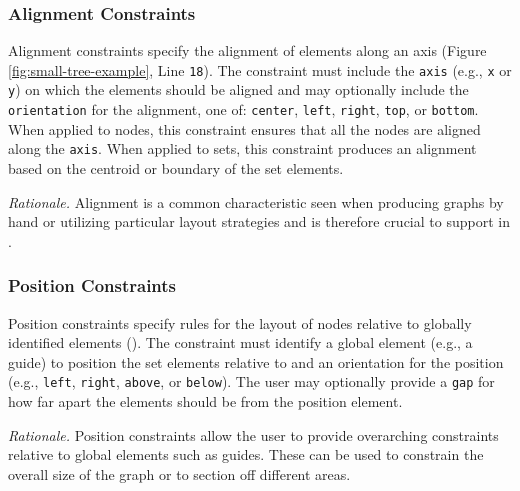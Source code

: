 \subsubsection{Alignment Constraints}
 Alignment constraints
specify the alignment of elements along an axis (Figure
\ref{fig:small-tree-example}, Line \texttt{18}). The constraint must
include the \texttt{axis} (e.g., \texttt{x} or \texttt{y}) on which the
elements should be aligned and may optionally include the
\texttt{orientation} for the alignment, one of: \texttt{center},
\texttt{left}, \texttt{right}, \texttt{top}, or \texttt{bottom}. When
applied to nodes, this constraint ensures that all the nodes are aligned
along the \texttt{axis}. When applied to sets, this constraint produces an
alignment based on the centroid or boundary of the set elements.

\emph{Rationale.} Alignment is a common characteristic seen when producing
graphs by hand  or utilizing particular layout strategies
 and is therefore crucial to support in \projectname.


\subsubsection{Position Constraints}
 Position constraints specify rules for the layout
of nodes relative to globally identified elements (). The
constraint must identify a global element (e.g., a guide) to position the
set elements relative to and an orientation for the position (e.g.,
\texttt{left}, \texttt{right}, \texttt{above}, or \texttt{below}). The user
may optionally provide a \texttt{gap} for how far apart the elements should
be from the position element.

\emph{Rationale.} Position constraints allow the user to provide
overarching constraints relative to global elements such as guides. These
can be used to constrain the overall size of the graph or to section off
different areas. 

